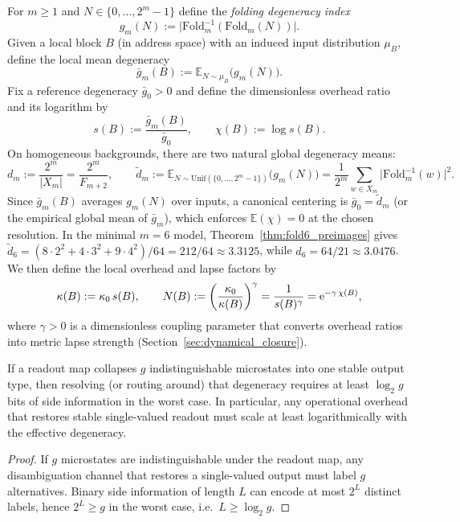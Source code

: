 \begin{definition}
\label{def:degeneracy_overhead}
For $m\ge 1$ and $N\in\{0,\dots,2^m-1\}$ define the \emph{folding degeneracy index}
\[
g_m(N):=\bigl|\mathrm{Fold}_m^{-1}(\mathrm{Fold}_m(N))\bigr|.
\]
Given a local block $B$ (in address space) with an induced input distribution $\mu_B$, define the local mean degeneracy
\[
\bar{g}_m(B):=\mathbb{E}_{N\sim\mu_B}\bigl(g_m(N)\bigr).
\]
Fix a reference degeneracy $\bar{g}_0>0$ and define the dimensionless overhead ratio and its logarithm by
\[
s(B):=\frac{\bar{g}_m(B)}{\bar{g}_0},
\qquad
\chi(B):=\log s(B).
\]
On homogeneous backgrounds, there are two natural global degeneracy means:
\[
d_m:=\frac{2^m}{|X_m|}=\frac{2^m}{F_{m+2}},
\qquad
\tilde d_m:=\mathbb{E}_{N\sim \mathrm{Unif}(\{0,\dots,2^m-1\})}\bigl(g_m(N)\bigr)=\frac{1}{2^m}\sum_{w\in X_m}\bigl|\mathrm{Fold}_m^{-1}(w)\bigr|^2.
\]
Since $\bar{g}_m(B)$ averages $g_m(N)$ over inputs, a canonical centering is $\bar{g}_0=\tilde d_m$ (or the empirical global mean of $\bar{g}_m$), which enforces $\mathbb{E}(\chi)=0$ at the chosen resolution.
In the minimal $m=6$ model, Theorem~\ref{thm:fold6_preimages} gives $\tilde d_6=(8\cdot 2^2+4\cdot 3^2+9\cdot 4^2)/64=212/64\approx 3.3125$, while $d_6=64/21\approx 3.0476$.
We then define the local overhead and lapse factors by
\[
\kappa(B):=\kappa_0\, s(B),
\qquad
N(B):=\left(\frac{\kappa_0}{\kappa(B)}\right)^{\gamma}=\frac{1}{s(B)^{\gamma}}=\mathrm{e}^{-\gamma\,\chi(B)},
\]
\noindent where $\gamma>0$ is a dimensionless coupling parameter that converts overhead ratios into metric lapse strength (Section~\ref{sec:dynamical_closure}).
\end{definition}

\begin{proposition}
\label{prop:disambiguation_cost}
If a readout map collapses $g$ indistinguishable microstates into one stable output type, then resolving (or routing around) that degeneracy requires at least $\log_2 g$ bits of side information in the worst case.
In particular, any operational overhead that restores stable single-valued readout must scale at least logarithmically with the effective degeneracy.
\end{proposition}

\begin{proof}
If $g$ microstates are indistinguishable under the readout map, any disambiguation channel that restores a single-valued output must label $g$ alternatives.
Binary side information of length $L$ can encode at most $2^L$ distinct labels, hence $2^L\ge g$ in the worst case, i.e.\ $L\ge \log_2 g$.
\end{proof}

